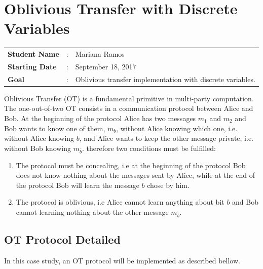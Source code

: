 \clearpage
\section{Oblivious Transfer with Discrete Variables}

\begin{tcolorbox}	
\begin{tabular}{p{2.75cm} p{0.2cm} p{10.5cm}} 	
\textbf{Student Name}  &:& Mariana Ramos\\
\textbf{Starting Date} &:& September 18, 2017\\
\textbf{Goal}          &:& Oblivious transfer implementation with discrete variables.
\end{tabular}
\end{tcolorbox}

Oblivious Transfer (OT) is a fundamental primitive in multi-party computation. The one-out-of-two OT consists in a communication protocol between Alice and Bob. At the beginning of the protocol Alice has two messages $m_1$ and $m_2$ and Bob wants to know one of them, $m_b$, without Alice knowing which one, i.e. without Alice knowing $b$, and Alice wants to keep the other message private, i.e. without Bob knowing $m_{\bar{b}}$. therefore two conditions must be fulfilled:
\begin{enumerate}
	\item{The protocol must be concealing, i.e at the beginning of the protocol Bob does not know nothing about the messages sent by Alice, while at the end of the protocol Bob will learn the message $b$ chose by him.}
	\item{The protocol is oblivious, i.e Alice cannot learn anything about bit $b$ and Bob cannot learning nothing about the other message $m_{\bar{b}}$.}
\end {enumerate}

\subsection{OT Protocol Detailed}
In this case study, an OT protocol will be implemented as described bellow.


